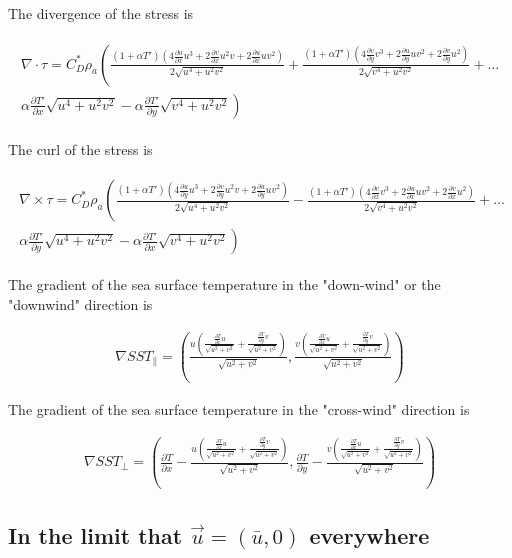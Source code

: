 \documentclass[12pt,a4paper]{article}
\newcommand{\dudx}{\frac{\partial u}{\partial x}}
\newcommand{\dudy}{\frac{\partial u}{\partial y}}
\newcommand{\dvdx}{\frac{\partial v}{\partial x}}
\newcommand{\dvdy}{\frac{\partial v}{\partial y}}
\newcommand{\dTdx}{\frac{\partial T}{\partial x}}
\newcommand{\dTdy}{\frac{\partial T}{\partial y}}
\newcommand{\dTpdx}{\frac{\partial T'}{\partial x}}
\newcommand{\dTpdy}{\frac{\partial T'}{\partial y}}
\begin{document}
The divergence of the stress is 

\begin{align*}
\begin{split}
\nabla \cdot \tau = C_D^* \rho_a \left( \frac{(1+\alpha T')(4\dudx u^3 + 2 \dvdx u^2 v + 2 \dudx u v^2)}{2\sqrt{u^4+u^2v^2}}+ \frac{(1+\alpha T')(4\dvdy v^3 + 2 \dudy u v^2 + 2 \dvdy u^2)}{2\sqrt{v^4+u^2v^2}}\right.+...\\
\left. \alpha\dTpdx\sqrt{u^4+u^2v^2}-\alpha\dTpdy\sqrt{v^4+u^2v^2} \right)
\end{split}
\end{align*}

The curl of the stress is 

\begin{align*}
\begin{split}
\nabla \times \tau = C_D^* \rho_a \left( \frac{(1+\alpha T')(4\dudy u^3 + 2 \dvdy u^2 v + 2 \dudy u v^2)}{2\sqrt{u^4+u^2v^2}}- \frac{(1+\alpha T')(4\dvdx v^3 + 2 \dudx u v^2 + 2 \dvdx u^2)}{2\sqrt{v^4+u^2v^2}}\right.+...\\
\left. \alpha\dTpdy\sqrt{u^4+u^2v^2}-\alpha\dTpdx\sqrt{v^4+u^2v^2} \right)
\end{split}
\end{align*}

The gradient of the sea surface temperature in the "down-wind" or the "downwind" direction is

\begin{align*}
\nabla SST_{\parallel} = \left( \frac{u\left( \frac{\dTdx u}{\sqrt{u^2+v^2}} + \frac{\dTdy v}{\sqrt{u^2+v^2}}\right)}{\sqrt{u^2+v^2}} ,  \frac{v\left( \frac{\dTdx u}{\sqrt{u^2+v^2}} + \frac{\dTdy v}{\sqrt{u^2+v^2}}\right)}{\sqrt{u^2+v^2}} \right)
\end{align*}

The gradient of the sea surface temperature in the "cross-wind" direction is

\begin{align*}
\nabla SST_{\bot} = \left(\dTdx- \frac{u\left( \frac{\dTdx u}{\sqrt{u^2+v^2}} + \frac{\dTdy v}{\sqrt{u^2+v^2}}\right)}{\sqrt{u^2+v^2}} , \dTdy- \frac{v\left( \frac{\dTdx u}{\sqrt{u^2+v^2}} + \frac{\dTdy v}{\sqrt{u^2+v^2}}\right)}{\sqrt{u^2+v^2}} \right)
\end{align*}


\subsection{In the limit that $\vec{u} = (\bar{u},0)$ everywhere}\label{sec:A_constant}
\end{document}
